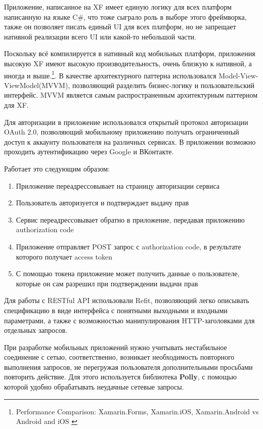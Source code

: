 \documentclass[14pt]{matmex-diploma-custom}
\begin{document}
        Приложение, написанное на XF имеет единую логику для всех платформ написанную на языке C\#,
        что тоже сыграло роль в выборе этого фреймворка, также он позволяет писать единый UI для всех платформ,
        но не запрещает нативной реализации всего UI или какой-то небольшой части.

        Поскольку всё компилируется в нативный код мобильных платформ, приложения высокую XF имеют высокую производительность,
        очень близкую к нативной, а иногда и выше.\footnote{Performance Comparison: Xamarin.Forms, Xamarin.iOS, Xamarin.Android vs Android and iOS \cite{perf_compar_2}}.
        В качестве архитектурного паттерна использовался Model-View-ViewModel(MVVM)\cite{MVVM_wiki},
        позволяющий разделить бизнес-логику и пользовательский интерфейс.
        MVVM является самым распространенным архитектурным паттерном для XF.

        Для авторизации в приложение использовался открытый протокол авторизации OAuth 2.0, позволяющий мобильному приложению получать ограниченный доступ к аккаунту пользователя на различных сервисах.
        В приложении возможно проходить аутентификацию через Google и ВКонтакте.

        Работает это следующим образом:
        \begin{enumerate}
            \item Приложение переадрессовывает на страницу авторизации сервиса
            \item Пользователь авторизуется и подтверждает выдачу прав
            \item Сервис переадрессовывает обратно в приложение, передавая приложению authorization code
            \item Приложение отправляет POST запрос с authorization code, в результате которого получает access token
            \item С помощью токена приложение может получить данные о пользователе, которые он сам разрешил при подтверждении выдачи прав
        \end{enumerate}

        Для работы с RESTful API использовали Refit,
        позволяющий легко описывать спецификацию в виде интерфейса с понятными выходными и входными параметрами,
        а также с возможностью манипулирования HTTP-заголовками для отдельных запросов.

        При разработке мобильных приложений нужно учитывать нестабильное соединение с сетью,
        соответственно, возникает необходимость повторного выполнения запросов,
        не перегружая пользователя дополнительными просьбами повторить действие.
        Для этого используется библиотека \textbf{Polly}\cite{polly_github}, с помощью которой удобно обрабатывать неудачные сетевые запросы.
\end{document}
